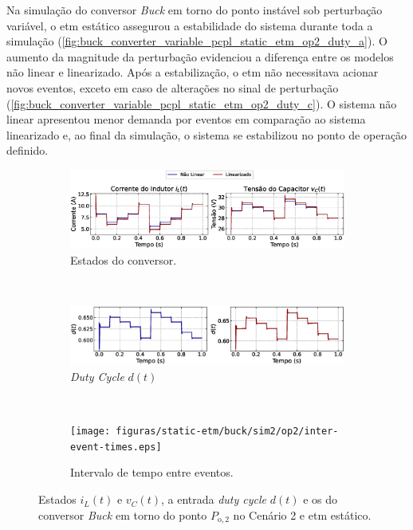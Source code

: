 Na simulação do conversor \textit{Buck} em torno do ponto instável sob perturbação variável, o \acrshort{etm} estático assegurou a estabilidade do sistema durante toda a simulação (\autoref{fig:buck_converter_variable_pcpl_static_etm_op2_duty_a}). O aumento da magnitude da perturbação evidenciou a diferença entre os modelos não linear e linearizado. Após a estabilização, o \acrshort{etm} não necessitava acionar novos eventos, exceto em caso de alterações no sinal de perturbação (\autoref{fig:buck_converter_variable_pcpl_static_etm_op2_duty_c}). O sistema não linear apresentou menor demanda por eventos em comparação ao sistema linearizado e, ao final da simulação, o sistema se estabilizou no ponto de operação definido.

\begin{figure}[H]
  \centering
  \captionsetup{justification=centering}
  \begin{subfigure}{1.\textwidth}
    \centering
    \includegraphics[width=1.\textwidth]{figuras/static-etm/buck/sim2/op2/result.eps}
    \caption{Estados do conversor.}
    \label{fig:buck_converter_variable_pcpl_static_etm_op2_duty_a}
  \end{subfigure}
  \\[6pt]
  \begin{subfigure}{1.\textwidth}
    \centering
    \includegraphics[width=1.\textwidth]{figuras/static-etm/buck/sim2/op2/duty-cycle.eps}
    \caption{\textit{Duty Cycle} $d(t)$}
    \label{fig:buck_converter_variable_pcpl_static_etm_op2_duty_b}
  \end{subfigure}
  \\[6pt]
  \begin{subfigure}{1.\textwidth}
    \centering
    \texttt{[image: figuras/static-etm/buck/sim2/op2/inter-event-times.eps]}
    \caption{Intervalo de tempo entre eventos.}
    \label{fig:buck_converter_variable_pcpl_static_etm_op2_duty_c}
  \end{subfigure}
  \caption{Estados $i_L(t)$ e $v_C(t)$, a entrada \textit{duty cycle} $d(t)$ e os  do conversor \textit{Buck} em torno do ponto $P_{\mathrm{o}, 2}$ no Cenário 2 e \acrshort{etm} estático.}
\end{figure}

